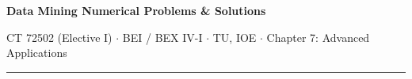 \documentclass[10pt]{article}
\begin{document}
{\LARGE\bfseries Data Mining \gap\textcolor{sub}{Numerical Problems \& Solutions}}\par
{\footnotesize\color{sub} CT 72502 (Elective I) $\cdot$ BEI / BEX IV-I $\cdot$ TU, IOE $\cdot$ Chapter 7: Advanced Applications}
\vspace{3pt}\hrule\vspace{4pt}




\end{document}
